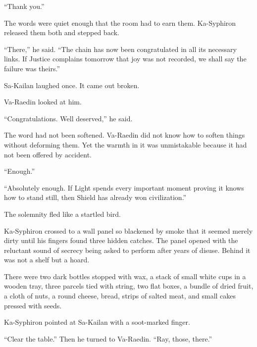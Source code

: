 “Thank you.”\par

The words were quiet enough that the room had to earn them.
Ka-Syphiron released them both and stepped back.\par

“There,” he said.
“The chain has now been congratulated in all its necessary links.
If Justice complains tomorrow that joy was not recorded, we shall say the failure was theirs.”\par

Sa-Kailan laughed once.
It came out broken.\par

Va-Raedin looked at him.\par

“Congratulations.
Well deserved,” he said.\par

The word had not been softened.
Va-Raedin did not know how to soften things without deforming them.
Yet the warmth in it was unmistakable because it had not been offered by accident.\par




“Enough.”\par
“Absolutely enough.
If Light spends every important moment proving it knows how to stand still, then Shield has already won civilization.”\par

The solemnity fled like a startled bird.\par

Ka-Syphiron crossed to a wall panel so blackened by smoke that it seemed merely dirty until his fingers found three hidden catches.
The panel opened with the reluctant sound of secrecy being asked to perform after years of disuse.
Behind it was not a shelf but a hoard.\par

There were two dark bottles stopped with wax, a stack of small white cups in a wooden tray, three parcels tied with string, two flat boxes, a bundle of dried fruit, a cloth of nuts, a round cheese, bread, strips of salted meat, and small cakes pressed with seeds.\par

Ka-Syphiron pointed at Sa-Kailan with a soot-marked finger.\par

“Clear the table.”
Then he turned to Va-Raedin.
“Ray, those, there.”\par

